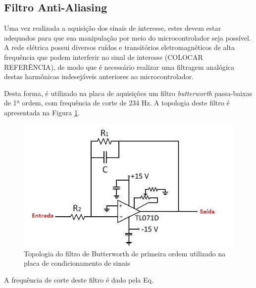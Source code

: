 \subsection{Filtro Anti-Aliasing}

	Uma vez realizada a aquisição dos sinais de interesse, estes devem estar adequados para que sua manipulação por meio do microcontrolador seja possível. A rede elétrica possui diversos ruídos e transitórios eletromagnéticos de alta frequência que podem interferir no sinal de interesse (COLOCAR REFERÊNCIA), de modo que é necessário realizar uma filtragem analógica destas harmônicas indesejáveis anteriores ao microcontrolador.
	
	Desta forma, é utilizado na placa de aquisições um filtro \textit{butterworth} passa-baixas de 1ª ordem, com frequência de corte de 234 Hz. A topologia deste filtro é apresentada na Figura \ref{fig:filtro-butter}.
	
\begin{figure}[!hbt]
         \begin{center}
         \includegraphics[scale=0.7]{figuras/filtro-butter.JPG}
         \caption{Topologia do filtro de Butterworth de primeira ordem utilizado na placa de condicionamento de sinais}
         \label{fig:filtro-butter}
         \end{center}
 \end{figure}


	A frequência de corte deste filtro é dado pela Eq. 
	
